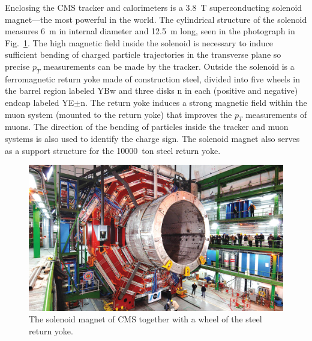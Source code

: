 

Enclosing the CMS tracker and calorimeters is a \SI{3.8}{T} superconducting solenoid magnet---the most powerful in the world. The cylindrical structure of the solenoid measures \SI{6}{m} in internal diameter and \SI{12.5}{m} long, seen in the photograph in Fig.~\ref{fig:Magnet}. The high magnetic field inside the solenoid is necessary to induce sufficient bending of charged particle trajectories in the transverse plane so precise $p_T$ measurements can be made by the tracker. Outside the solenoid is a ferromagnetic return yoke made of construction steel, divided into five wheels in the barrel region labeled YBw and three disks n in each (positive and negative) endcap labeled YE$\pm$n. The return yoke induces a strong magnetic field within the muon system (mounted to the return yoke) that improves the $p_T$ measurements of muons. The direction of the bending of particles inside the tracker and muon systems is also used to identify the charge sign. The solenoid magnet also serves as a support structure for the \SI{10000}{ton} steel return yoke.

\begin{figure}[H]
    \centering
    \includegraphics[width=\textwidth]{Images/CMS/Magnet.jpg}
    \caption{The solenoid magnet of CMS together with a wheel of the steel return yoke.}
    \label{fig:Magnet}
\end{figure}
